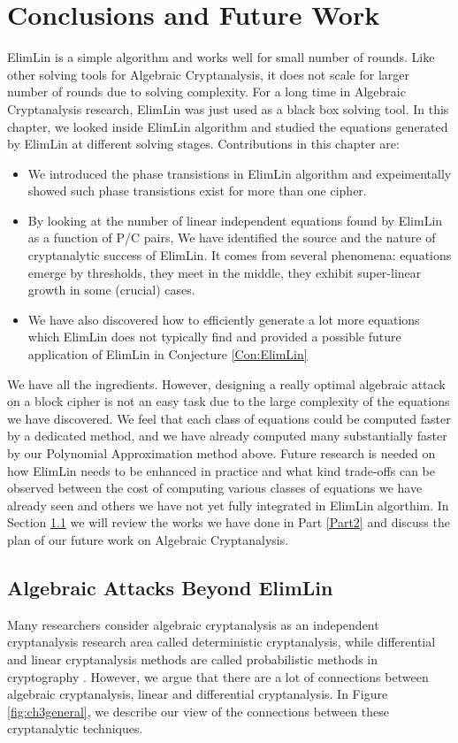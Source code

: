 \section{Conclusions and Future Work}
ElimLin is a simple algorithm and works well for small number of rounds. Like other solving tools for Algebraic Cryptanalysis, it does not scale for larger number of rounds due to solving complexity. For a long time in Algebraic Cryptanalysis research, ElimLin was just used as a black box solving tool. In this chapter, we looked inside ElimLin algorithm and studied the equations generated by ElimLin at different solving stages. Contributions in this chapter are:
\begin{itemize}
	\item We introduced the phase transistions in ElimLin algorithm and expeimentally showed such phase transistions exist for more than one cipher. 
	\item By looking at the number of linear independent equations found by ElimLin as a function of P/C pairs, We have identified the source and the nature of cryptanalytic success of ElimLin. It comes from several phenomena: equations emerge by thresholds, they meet in the middle, they exhibit super-linear growth in some (crucial) cases.
	\item We have also discovered how to efficiently generate a lot more equations which ElimLin does not typically find and provided a possible future application of ElimLin in Conjecture \ref{Con:ElimLin} 
\end{itemize}
We have all the ingredients. However, designing a really optimal algebraic attack on a block cipher is not an easy task due to the large complexity of the equations we have discovered. We feel that each class of equations could be computed faster by a dedicated method, and we have already computed many substantially faster by our Polynomial Approximation method above. Future research is needed on how ElimLin needs to be enhanced in practice and what kind trade-offs can be observed between the cost of computing various classes of equations we have already seen and others we have not yet fully integrated in ElimLin algorthim. In Section \ref{ElimLin+} we will review the works we have done in Part \ref{Part2} and discuss the plan of our future work on Algebraic Cryptanalysis.

\subsection{Algebraic Attacks Beyond ElimLin} \label{ElimLin+}
Many researchers consider algebraic cryptanalysis as an independent cryptanalysis research area called deterministic cryptanalysis, while differential and linear cryptanalysis methods are called probabilistic methods in cryptography \cite{pasalic2009probabilistic}. However, we argue that there are a lot of connections between algebraic cryptanalysis, linear and differential cryptanalysis. In Figure \ref{fig:ch3general}, we describe our view of the connections between these cryptanalytic techniques.

